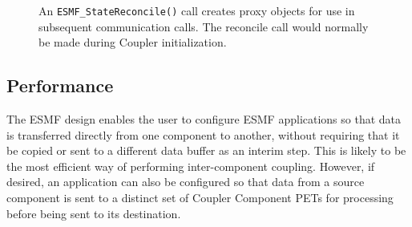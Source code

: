 \begin{center}
\begin{figure}
\caption{An {\tt ESMF\_StateReconcile()} call creates proxy 
objects for use in subsequent communication calls.  The reconcile 
call would normally be made during Coupler initialization.}
\label{fig:reconcile}
\end{figure}
\end{center}

\subsection{Performance}
\label{sec:performance}

The ESMF design enables the user to configure ESMF
applications so that data is transferred directly from one component 
to another, without requiring that it be copied or sent to a different data
buffer as an interim step.  This is likely to be the most efficient way 
of performing inter-component coupling.  However, if desired, an 
application can also be configured so that data from a source component 
is sent to a distinct set of Coupler Component PETs for processing 
before being sent to its destination.

